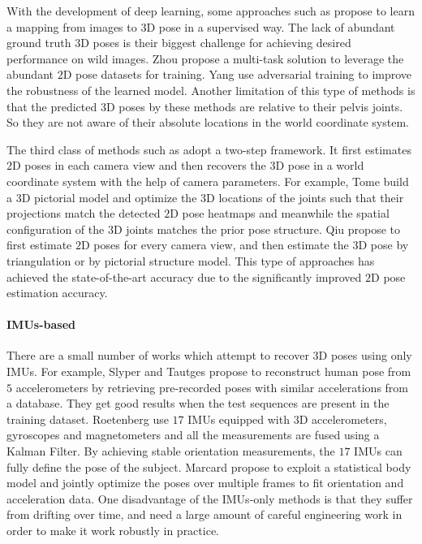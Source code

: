 \documentclass[10pt,twocolumn,letterpaper]{article}
\begin{document}
With the development of deep learning, some approaches such as \cite{Rhodin_2018_ECCV,rhodin2018learning,martinez2017simple,trumble2018deep,jafarian2018monet,pavllo20193d} propose to learn a mapping from images to $3$D pose in a supervised way. The lack of abundant ground truth $3$D poses is their biggest challenge for achieving desired performance on wild images. Zhou \etal \cite{zhou2017towards} propose a multi-task solution to leverage the abundant $2$D pose datasets for training. Yang \etal \cite{yang20183d} use adversarial training to improve the robustness of the learned model. Another limitation of this type of methods is that the predicted $3$D poses by these methods are relative to their pelvis joints. So they are not aware of their absolute locations in the world coordinate system.

The third class of methods such as \cite{amin2013multi,burenius20133D,PavlakosZDD17,belagiannis20143D,gilbert2018volumetric,joo2019panoptic,dong2019fast,qiu2019cross} adopt a two-step framework. It first estimates $2$D poses in each camera view and then recovers the $3$D pose in a world coordinate system with the help of camera parameters. For example, Tome \etal \cite{tome2018rethinking} build a $3$D pictorial model and optimize the $3$D locations of the joints such that their projections match the detected $2$D pose heatmaps and meanwhile the spatial configuration of the $3$D joints matches the prior pose structure. Qiu \etal \cite{qiu2019cross} propose to first estimate $2$D poses for every camera view, and then estimate the $3$D pose by triangulation or by pictorial structure model. This type of approaches has achieved the state-of-the-art accuracy due to the significantly improved $2$D pose estimation accuracy. 


\paragraph{IMUs-based} There are a small number of works which attempt to recover $3$D poses using only IMUs. For example, Slyper \etal \cite{slyper2008action} and  Tautges \etal \cite{tautges2011motion} propose to reconstruct human pose from $5$ accelerometers by retrieving pre-recorded poses with similar accelerations from a database. They get good results when the test sequences are present in the training dataset. Roetenberg \etal \cite{roetenberg2009xsens} use $17$ IMUs equipped with $3$D accelerometers, gyroscopes and magnetometers and all the measurements are fused using a Kalman Filter. By achieving stable orientation measurements, the $17$ IMUs can fully define the pose of the subject. Marcard \etal \cite{von2017sparse} propose to exploit a statistical body model and jointly optimize the poses over multiple frames to fit orientation and acceleration data. One disadvantage of the IMUs-only methods is that they suffer from drifting over time, and need a large amount of careful engineering work in order to make it work robustly in practice.
\end{document}
